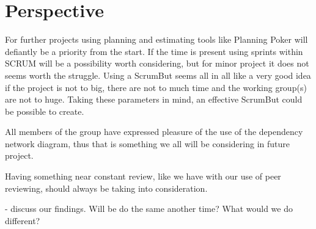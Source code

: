 \section{Perspective}
For further projects using planning and estimating tools like Planning Poker will defiantly be a priority from the start. If the time is present using sprints within SCRUM will be a possibility worth considering, but for minor project it does not seems worth the struggle.
Using a ScrumBut seems all in all like a very good idea if the project is not to big, there are not to much time and the working group(s) are not to huge. Taking these parameters in mind, an effective ScrumBut could be possible to create.

All members of the group have expressed pleasure of the use of the dependency network diagram, thus that is something we all will be considering in future project.

Having something near constant review, like we have with our use of peer reviewing, should always be taking into consideration.

- discuss our findings. Will be do the same another time? What would we do different?

\newpage